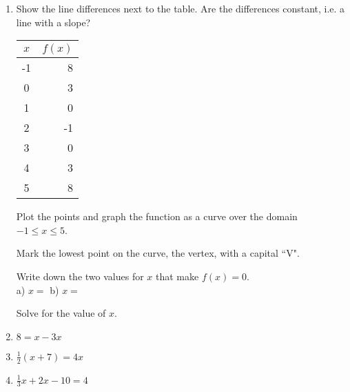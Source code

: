 \documentclass[12pt, oneside]{article}
\begin{document}
\begin{enumerate}
\newpage
  \item Show the line differences next to the table. Are the differences constant, i.e. a line with a slope?
      \begin{center}
        \begin{tabular}{|c|r|}
        \hline
        $x$ & $f(x)$\\
        \hline
        -1 & 8 \\
        \hline
        0 & 3 \\
        \hline
        1 & 0 \\
        \hline
        2 & -1 \\
        \hline
        3 & 0 \\
        \hline
        4 & 3 \\
        \hline
        5 & 8 \\
        \hline
        \end{tabular}
      \end{center}

  Plot the points and graph the function as a curve over the domain $-1 \leq x \leq 5$.

  \begin{center} %
  \end{center}

  Mark the lowest point on the curve, the vertex, with a capital ``V".\\ \bigskip

  Write down the two values for $x$ that make $f(x)=0$. \\[0.5cm]
  a) $x=$ \hspace{3cm} b) $x=$

  \newpage

Solve for the value of $x$.
\item   $8=x-3x$ \vspace{3cm}
\item   $\frac{1}{2}(x+7)=4x$ \vspace{4cm}
\item   $\frac{1}{3}x+2x-10=4$ \vspace{4cm}


\end{enumerate}
\end{document}
